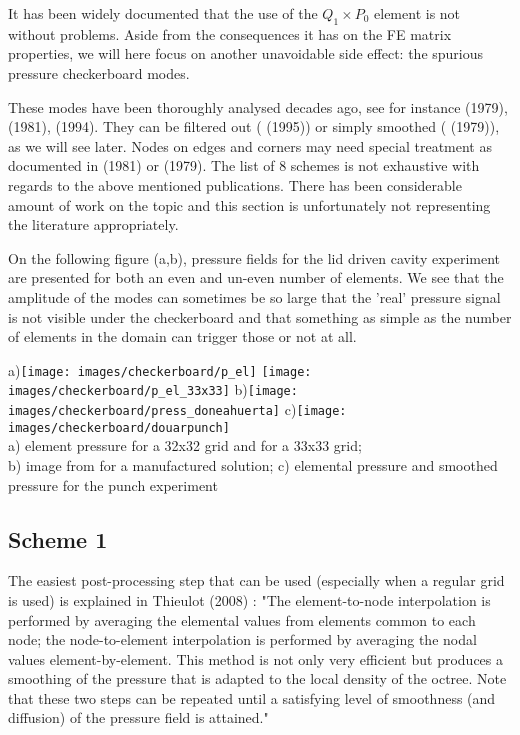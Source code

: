 
It has been widely documented that the use of the $Q_1 \times P_0$ element is 
not without problems. Aside from the 
consequences it has on the FE matrix properties, we will here focus on another unavoidable side effect: 
the spurious pressure checkerboard modes. 

These modes have been thoroughly analysed decades ago, see for instance
\textcite{hulb79} (1979), 
\textcite{sagl81a,sagl81b} (1981),
\textcite{grsi94} (1994).
They can be filtered out (\textcite{chpc95} (1995)) 
or simply smoothed (\textcite{legs79} (1979)), as we will see later.
Nodes on edges and corners may need special treatment as documented in \textcite{sagl81a} (1981) 
or \textcite{legs79} (1979).
The list of 8 schemes is not exhaustive with regards to the above mentioned publications. 
There has been considerable amount of work on the topic and this section is 
unfortunately not representing the literature appropriately.


On the following figure (a,b), pressure fields for the lid driven cavity experiment 
are presented for both an even and un-even number of elements. We see that 
the amplitude of the modes can sometimes be so large that the 'real' pressure signal is 
not visible under the checkerboard and that something as simple as the number of elements in the 
domain can trigger those or not at all.

\begin{center}
a)\texttt{[image: images/checkerboard/p\_el]}
\texttt{[image: images/checkerboard/p\_el\_33x33]}
b)\texttt{[image: images/checkerboard/press\_doneahuerta]}
c)\texttt{[image: images/checkerboard/douarpunch]}\\
{\captionfont a) element pressure for a 32x32 grid and for a 33x33 grid;\\ 
b) image from \cite[p307]{dohu03} for a manufactured solution;
c) elemental pressure and smoothed pressure for the punch experiment \cite{thfb08}}
\end{center}

\subsection{Scheme 1}

The easiest post-processing step that can be used (especially when a regular grid is used) 
is explained in Thieulot \etal (2008) \cite{thfb08}: "The element-to-node interpolation is performed by
averaging the elemental values from elements common to each node; 
the node-to-element interpolation is performed
by averaging the nodal values element-by-element. This
method is not only very efficient but produces a smoothing
of the pressure that is adapted to the local density of the
octree. Note that these two steps can be repeated until a
satisfying level of smoothness (and diffusion) of the pressure field is attained."


